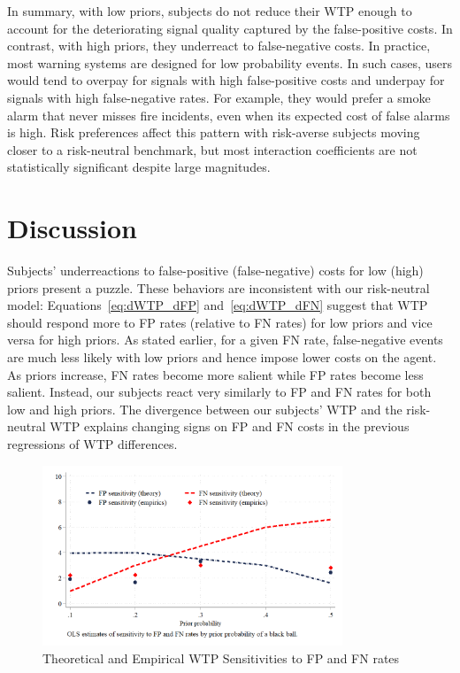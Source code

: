 \documentclass[12pt,a4paper]{article}
\begin{document}
In summary, with low priors, subjects do not reduce their WTP enough to account for the deteriorating signal quality captured by the false-positive costs. In contrast, with high priors, they underreact to false-negative costs. In practice, most warning systems are designed for low probability events. In such cases, users would tend to overpay for signals with high false-positive costs and underpay for signals with high false-negative rates. For example, they would prefer a smoke alarm that never misses fire incidents, even when its expected cost of false alarms is high. Risk preferences affect this pattern with risk-averse subjects moving closer to a risk-neutral benchmark, but most interaction coefficients are not statistically significant despite large magnitudes.


\section{Discussion}\label{sec:discussion}

Subjects' underreactions to false-positive (false-negative) costs for low (high) priors present a puzzle. These behaviors are inconsistent with our risk-neutral model: Equations~\ref{eq:dWTP_dFP} and~\ref{eq:dWTP_dFN} suggest that WTP should respond more to FP rates (relative to FN rates) for low priors and vice versa for high priors. As stated earlier, for a given FN rate, false-negative events are much less likely with low priors and hence impose lower costs on the agent. As priors increase, FN rates become more salient while FP rates become less salient. Instead, our subjects react very similarly to FP and FN rates for both low and high priors. The divergence between our subjects' WTP and the risk-neutral WTP explains changing signs on FP and FN costs in the previous regressions of WTP differences.



\begin{figure}[H]
\centering
\caption{Theoretical and Empirical WTP Sensitivities to FP and FN rates} \label{fig:Comparison}
\includegraphics[width=0.8\textwidth]{Graphs/sensit_comparison.png}
\end{figure}
\end{document}
